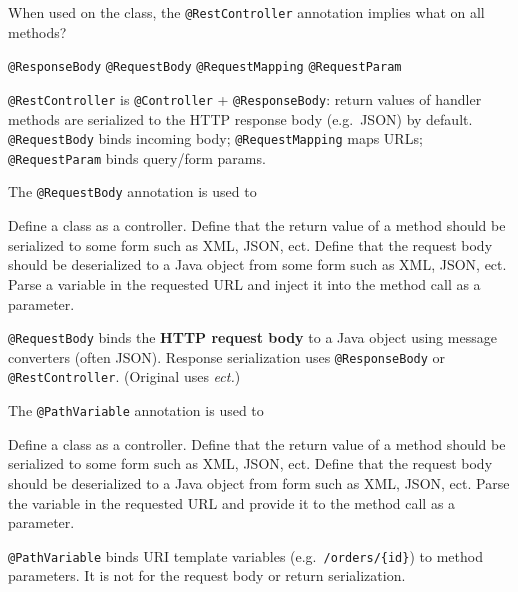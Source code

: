 \question[4]
When used on the class, the \texttt{@RestController} annotation implies what on all methods?
\begin{choices}
  \CorrectChoice \texttt{@ResponseBody}
  \choice \texttt{@RequestBody}
  \choice \texttt{@RequestMapping}
  \choice \texttt{@RequestParam}
\end{choices}
\begin{solution}
  \texttt{@RestController} is \texttt{@Controller} + \texttt{@ResponseBody}: return values of handler methods are serialized to the HTTP response body (e.g.\ JSON) by default. \texttt{@RequestBody} binds incoming body; \texttt{@RequestMapping} maps URLs; \texttt{@RequestParam} binds query/form params.
\end{solution}

\question[4]
The \texttt{@RequestBody} annotation is used to
\begin{choices}
  \choice Define a class as a controller.
  \choice Define that the return value of a method should be serialized to some form such as XML, JSON, ect.
  \CorrectChoice Define that the request body should be deserialized to a Java object from some form such as XML, JSON, ect.
  \choice Parse a variable in the requested URL and inject it into the method call as a parameter.
\end{choices}
\begin{solution}
  \texttt{@RequestBody} binds the \textbf{HTTP request body} to a Java object using message converters (often JSON). Response serialization uses \texttt{@ResponseBody} or \texttt{@RestController}. (Original uses \textit{ect.})
\end{solution}

\question[4]
The \texttt{@PathVariable} annotation is used to
\begin{choices}
  \choice Define a class as a controller.
  \choice Define that the return value of a method should be serialized to some form such as XML, JSON, ect.
  \choice Define that the request body should be deserialized to a Java object from form such as XML, JSON, ect.
  \CorrectChoice Parse the variable in the requested URL and provide it to the method call as a parameter.
\end{choices}
\begin{solution}
  \texttt{@PathVariable} binds URI template variables (e.g.\ \texttt{/orders/\{id\}}) to method parameters. It is not for the request body or return serialization.
\end{solution}

